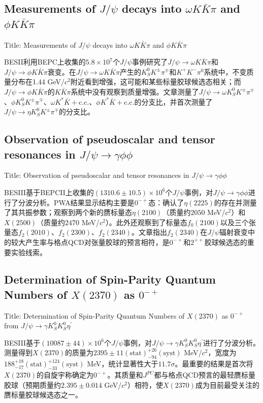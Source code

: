 \documentclass{article}
\begin{document}
\subsection{Measurements of $J/\psi$ decays into $\omega K\bar{K}\pi$ and $\phi K\bar{K}\pi$}

Title: \quad Measurements of $J/\psi$ decays into $\omega K\bar{K}\pi$ and $\phi K\bar{K}\pi$ \cite{BESII_2008}

BESII利用BEPC上收集的$5.8\times10^{7}$个$J/\psi$事例研究了$J/\psi\to\omega K\bar{K}\pi$和$J/\psi\to\phi K\bar{K}\pi$衰变。在$J/\psi\to\omega K\bar{K}\pi$产生的$K_{S}^{0}K^{\pm}\pi^{\mp}$和$K^{+}K^{-}\pi^{0}$系统中，不变质量分布在1.44 GeV/$c^{2}$附近看到增强，这可能和某些标量胶球候选态相关；而$J/\psi\to\phi K\bar{K}\pi$的$K\bar{K}\pi$系统中没有观察到质量增强。文章测量了$J/\psi\to\omega K_{S}^{0}K^{\pm}\pi^{\mp}$、$\phi K_{S}^{0}K^{\pm}\pi^{\mp}$、$\omega K^{*}\bar{K}+\text{c.c.}$、$\phi K^{*}\bar{K}+\text{c.c.}$的分支比，并首次测量了$J/\psi\to\eta K_{S}^{0}K^{\pm}\pi^{\mp}$的分支比。


\subsection{Observation of pseudoscalar and tensor resonances in $J/\psi\to\gamma\phi\phi$}

Title: \quad Observation of pseudoscalar and tensor resonances in $J/\psi\to\gamma\phi\phi$ \cite{BESIII_2016_phigammaphi}

BESIII基于BEPCII上收集的$(1310.6\pm10.5)\times10^{6}$个$J/\psi$事例，对$J/\psi\to\gamma\phi\phi$进行了分波分析。PWA结果显示结构主要是$0^{-+}$态：确认了$\eta(2225)$的存在并测量了其共振参数；观察到两个新的赝标量态$\eta(2100)$（质量约$2050$ MeV/$c^{2}$）和$X(2500)$（质量约$2470$ MeV/$c^{2}$）。此外还观察到了标量态$f_{0}(2100)$以及三个张量态$f_{2}(2010)$、$f_{2}(2300)$、$f_{2}(2340)$。文章指出$f_{2}(2340)$在$J/\psi$辐射衰变中的较大产生率与格点QCD对张量胶球的预言相符，是$0^{-+}$和$2^{++}$胶球候选态的重要实验线索。


\subsection{Determination of Spin-Parity Quantum Numbers of $X(2370)$ as $0^{-+}$}

Title: \quad Determination of Spin-Parity Quantum Numbers of $X(2370)$ as $0^{-+}$ from $J/\psi\rightarrow\gamma K_{S}^{0} K_{S}^{0} \eta^{\prime}$ \cite{BESIII_2024_X2370}

BESIII基于$(10087\pm44)\times10^{6}$个$J/\psi$事例，对$J/\psi\to\gamma K_{S}^{0}K_{S}^{0}\eta^{\prime}$进行了分波分析。测量得到$X(2370)$的质量为$2395\pm11(\text{stat})^{+26}_{-94}(\text{syst})$ MeV/$c^{2}$，宽度为$188^{+18}_{-17}(\text{stat})^{+124}_{-33}(\text{syst})$ MeV，统计显著性大于$11.7\sigma$。最重要的结果是首次将$X(2370)$的自旋宇称确定为$0^{-+}$。其质量和$J^{PC}$都与格点QCD预言的最轻赝标量胶球（预期质量约$2.395\pm0.014$ GeV/$c^{2}$）相符，使$X(2370)$成为目前最受关注的赝标量胶球候选态之一。
\end{document}
